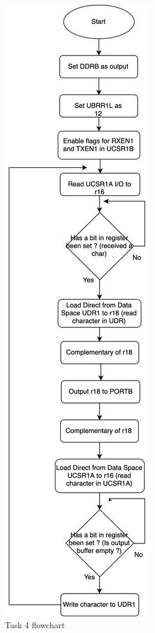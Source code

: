 \documentclass[a4paper,12pt]{article}
\begin{document}
\begin{figure}
\begin{center}
\includegraphics[width=\textwidth/3 ]{flowchart/task4_flowchart.png}
\end{center}
\caption{Task 4 flowchart}
\label{task4}
\end{figure}
\end{document}
